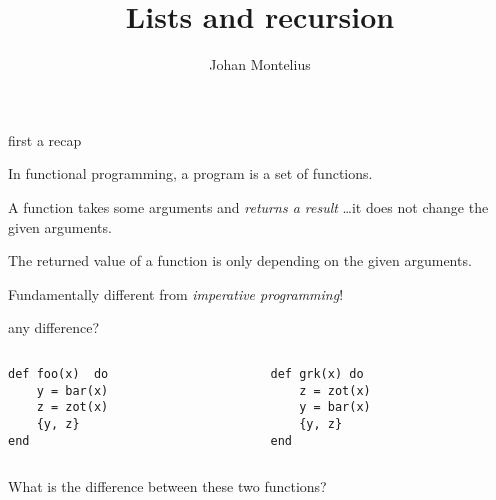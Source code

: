

\title[ID1019 Recursion]{Lists and recursion}


\author{Johan Montelius}
\date{\semester}



\begin{frame}
\titlepage
\end{frame}

\begin{frame}{first a recap}

\pause In functional programming, a program is a set of functions.

\vspace{20pt}\pause A function takes some arguments and {\em returns a result} \ldots it does not change the given arguments.

\vspace{20pt}\pause The returned value of a function is only depending on the given arguments.

\vspace{20pt}\pause Fundamentally different from {\em imperative programming}!


\end{frame}

\begin{frame}[fragile]{any difference?}

\begin{columns}
 \begin{column}{0.5\linewidth}
\begin{verbatim} 
def foo(x)  do
    y = bar(x)
    z = zot(x)
    {y, z}
end
\end{verbatim}
 \end{column}
 \pause  
  \begin{column}{0.5\linewidth}
\begin{verbatim} 
def grk(x) do
    z = zot(x)
    y = bar(x)
    {y, z}
end
\end{verbatim}
 \end{column}
\end{columns}

\vspace{40pt} 
\pause What is the difference between these two functions?

\end{frame}

